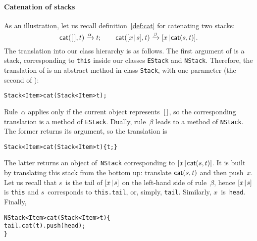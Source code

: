\paragraph{Catenation of stacks}

As an illustration, let us
recall definition~\eqref{def:cat} 
 for catenating two stacks:
\begin{equation*}
\textsf{cat}(        [\,],t) \xrightarrow{\smash{\alpha}} t;\qquad
\textsf{cat}([{x}\!\mid\!{s}],t) \xrightarrow{\smash{\beta}}
                                          [{x}\!\mid\!{\textsf{cat}(s,t)}].
\end{equation*}
The translation into our \Java class hierarchy is as follows. The
first argument of  is a stack, corresponding to
\texttt{this} inside our classes \texttt{EStack} and
\texttt{NStack}. Therefore, the translation of  is an
abstract \Java method in class \texttt{Stack}, with one parameter (the
second of ):
\begin{alltt}
\public \abstractX Stack<Item> cat(\final Stack<Item> t);
\end{alltt}
Rule~\(\alpha\) applies only if the current object represents~\([\,]\),
so the corresponding translation is a method of
\texttt{EStack}. Dually, rule~\(\beta\) leads to a method of
\texttt{NStack}. The former returns its argument, so the translation
is
\begin{alltt}
\public Stack<Item> cat(\final Stack<Item> t) \{ \return t; \}
\end{alltt}
The latter returns an object of~\texttt{NStack} corresponding to
\([{x}\!\mid\!{\textsf{cat}(s,t)}]\). It is built by translating this stack
from the bottom up: translate
\(\textsf{cat}(s,t)\) and then push~\(x\). Let
us recall that \(s\)~is the tail of \([{x}\!\mid\!{s}]\) on the
left\hyp{}hand side of rule~\(\beta\), hence \([{x}\!\mid\!{s}]\) is
\texttt{this} and \(s\)~corresponds to \texttt{this.tail}, or, simply,
\texttt{tail}. Similarly, \(x\)~is~\texttt{head}. Finally,
\begin{alltt}
\public NStack<Item> cat(\final Stack<Item> t) \{
  \return tail.cat(t).push(head);
\}
\end{alltt}
